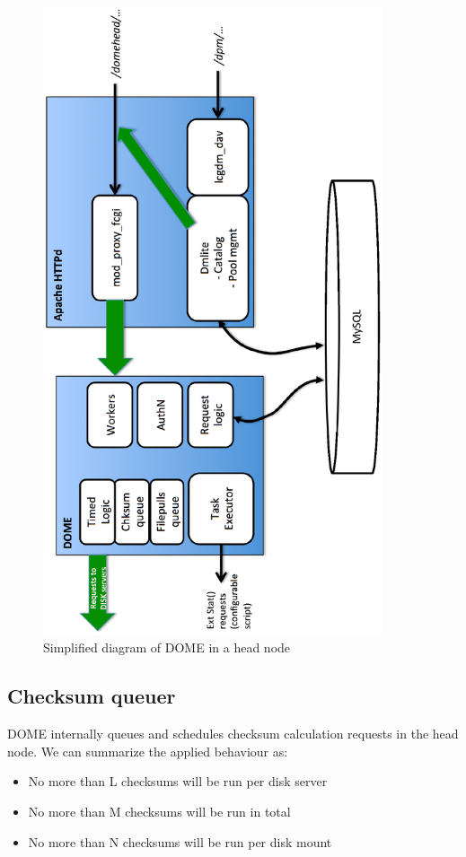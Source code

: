 \documentclass[a4paper]{jpconf}
\begin{document}
\begin{figure}
\begin{center}
 \includegraphics[width=10cm,keepaspectratio=true,angle=-90]{./pics/domepics_head.eps}
 \caption{Simplified diagram of DOME in a head node}
 \label{figdomehead}
\end{center}

\end{figure}

\subsection{Checksum queuer}
 DOME internally queues and schedules checksum calculation requests in the head node. We can summarize the applied behaviour as:
 \begin{itemize}
  \item No more than L checksums will be run per disk server\\
  \item No more than M checksums will be run in total\\
  \item No more than N checksums will be run per disk mount\\
 \end{itemize}
 
\end{document}
